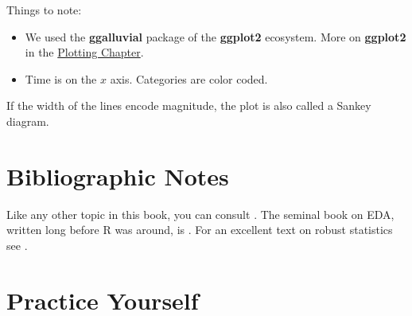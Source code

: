 \documentclass[]{book}
\providecommand{\tightlist}{%
  \setlength{\itemsep}{0pt}\setlength{\parskip}{0pt}}
\theoremstyle{definition}
\theoremstyle{definition}
\theoremstyle{definition}
\theoremstyle{remark}
\let\BeginKnitrBlock\begin \let\EndKnitrBlock\end
\begin{document}
Things to note:

\begin{itemize}
\tightlist
\item
  We used the \textbf{ggalluvial} package of the \textbf{ggplot2}
  ecosystem. More on \textbf{ggplot2} in the
  \protect\hyperlink{plotting}{Plotting Chapter}.
\item
  Time is on the \(x\) axis. Categories are color coded.
\end{itemize}

\BeginKnitrBlock{remark}
{}If the width of the lines encode magnitude,
the plot is also called a Sankey diagram.
\EndKnitrBlock{remark}

\section{Bibliographic Notes}\label{bibliographic-notes-3}

Like any other topic in this book, you can consult
\citet{venables2013modern}. The seminal book on EDA, written long before
R was around, is \citet{tukey1977exploratory}. For an excellent text on
robust statistics see \citet{wilcox2011introduction}.

\section{Practice Yourself}\label{practice-yourself-2}
\end{document}
